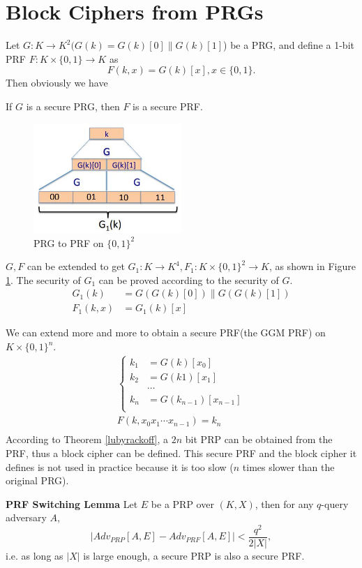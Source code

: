 \section{Block Ciphers from PRGs}
Let $G:K\rightarrow K^2(G(k)=G(k)[0]\parallel G(k)[1]$) be a PRG, and define a 1-bit PRF $F:K\times\{0,1\}\rightarrow K$ as 
\[F(k,x)=G(k)[x], x\in\{0,1\}.\]
Then obviously we have
\begin{theorem}
If $G$ is a secure PRG, then $F$ is a secure PRF.
\end{theorem}
\begin{figure}[ht]
\centering
\includegraphics[width=0.5\textwidth]{prg2prf_g1.jpg}
\caption{PRG to PRF on $\{0,1\}^2$}\label{prg2prf_g1}
\end{figure}
$G,F$ can be extended to get $G_1:K\rightarrow K^4, F_1:K\times\{0,1\}^2\rightarrow K$, as shown in Figure \ref{prg2prf_g1}. The security of $G_1$ can be proved according to the security of $G$.
\begin{align*}
G_1(k)&=G(G(k)[0])\parallel G(G(k)[1])\\
F_1(k, x)&=G_1(k)[x]
\end{align*}

We can extend more and more to obtain a secure PRF(the GGM PRF) on $K\times\{0,1\}^n$.
\begin{align*}
\begin{cases}
  k_1&=G(k)[x_0]\\
k_2&=G(k1)[x_1]\\
&\cdots\\
k_n&=G(k_{n-1})[x_{n-1}]\\
\end{cases}\\
F(k,x_0x_1\cdots x_{n-1})=k_n\\
\end{align*}
According to Theorem \ref{lubyrackoff}, a $2n$ bit PRP can be obtained from the PRF, thus a block cipher can be defined. This secure PRF and the block cipher it defines is not used in practice because it is too slow ($n$ times slower than the original PRG).
\begin{lemma}
\textbf{PRF Switching Lemma}
Let $E$ be a PRP over $(K,X)$, then for any $q$-query adversary $A$,
\[\left\lvert Adv_{PRP}[A,E]-Adv_{PRF}[A,E]\right\rvert<\frac{q^2}{2|X|},\]
i.e. as long as $|X|$ is large enough, a secure PRP is also a secure PRF.
\end{lemma}
